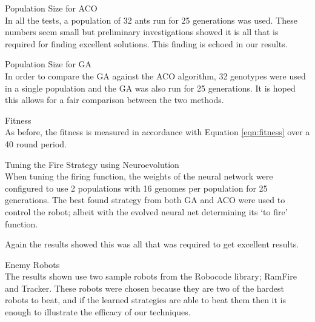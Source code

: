 \begin{description}
\item Population Size for ACO \hfill \\
In all the tests, a population of 32 ants run for 25 generations was used. These numbers seem small but preliminary investigations showed it is all that is required for finding excellent solutions. This finding is echoed in our results.

\item Population Size for GA \hfill \\
In order to compare the GA against the ACO algorithm, 32 genotypes were used in a single population and the GA was also run for 25 generations. It is hoped this allows for a fair comparison between the two methods.

\item Fitness \hfill \\
As before, the fitness is measured in accordance with Equation \ref{eqn:fitness} over a 40 round period. 

\item Tuning the Fire Strategy using Neuroevolution \hfill \\
When tuning the firing function, the weights of the neural network were configured to use 2 populations with 16 genomes per population for 25 generations. The best found strategy from both GA and ACO were used to control the robot; albeit with the evolved neural net determining its `to fire' function.

Again the results showed this was all that was required to get excellent results.

\item Enemy Robots \hfill \\
The results shown use two sample robots from the Robocode library; RamFire and Tracker. These robots were chosen because they are two of the hardest robots to beat, and if the learned strategies are able to beat them then it is enough to illustrate the efficacy of our techniques.

\end{description}


